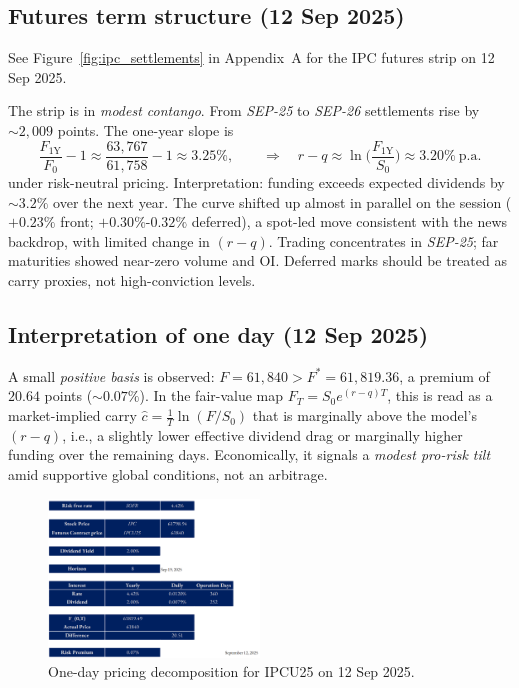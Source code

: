 \documentclass[11pt,a4paper]{article} %
\begin{document}
\subsection{Futures term structure (12 Sep 2025)}

See Figure~\ref{fig:ipc_settlements} in Appendix~A for the IPC futures strip on 12 Sep 2025.


The strip is in \emph{modest contango}. From \textit{SEP-25} to \textit{SEP-26} settlements rise by \(\sim 2{,}009\) points. The one-year slope is
\[
\frac{F_{1\mathrm{Y}}}{F_{0}}-1 \approx \frac{63{,}767}{61{,}758}-1 \approx {3.25\%},
\qquad
\Rightarrow\quad r-q \approx \ln\!\Big(\frac{F_{1\mathrm{Y}}}{S_0}\Big)\approx {3.20\%\ \text{p.a.}}
\]
under risk-neutral pricing. Interpretation: funding exceeds expected dividends by \(\sim 3.2\%\) over the next year.
The curve shifted up almost in parallel on the session (\(+0.23\%\) front; \(+0.30\%\)-\(0.32\%\) deferred), a spot-led move consistent with the news backdrop, with limited change in \((r-q)\).
Trading concentrates in \textit{SEP-25}; far maturities showed near-zero volume and OI. Deferred marks should be treated as carry proxies, not high-conviction levels.

\subsection{Interpretation of one day (12 Sep 2025)}
A small \emph{positive basis} is observed: \(F=61{,}840>F^{*}=61{,}819.36\), a premium of \(20.64\) points (\(\sim {0.07\%}\)). In the fair-value map \(F_T=S_0 e^{(r-q)T}\), this is read as a market-implied carry \(\hat c=\frac{1}{T}\ln(F/S_0)\) that is marginally above the model's \((r-q)\), i.e., a slightly lower effective dividend drag or marginally higher funding over the remaining days. Economically, it signals a \emph{modest pro-risk tilt} amid supportive global conditions, not an arbitrage.


\begin{figure}[h]
  \centering
  \includegraphics[width=0.5\textwidth]{figures/ipc.png}
 \caption{One-day pricing decomposition for IPCU25 on 12 Sep 2025.}
\end{figure}
\end{document}
